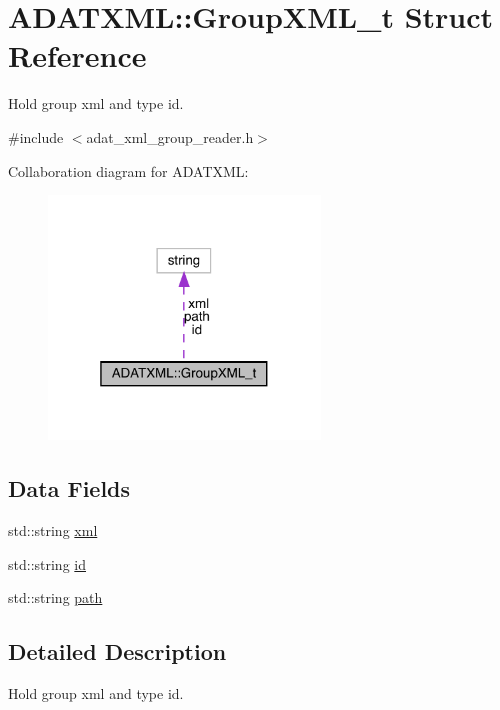 \hypertarget{structADATXML_1_1GroupXML__t}{}\section{A\+D\+A\+T\+X\+ML\+:\+:Group\+X\+M\+L\+\_\+t Struct Reference}
\label{structADATXML_1_1GroupXML__t}


Hold group xml and type id.  




{\ttfamily \#include $<$adat\+\_\+xml\+\_\+group\+\_\+reader.\+h$>$}



Collaboration diagram for A\+D\+A\+T\+X\+ML\+:\nopagebreak
\begin{figure}[H]
\begin{center}
\leavevmode
\includegraphics[width=205pt]{d7/d02/structADATXML_1_1GroupXML__t__coll__graph}
\end{center}
\end{figure}
\subsection*{Data Fields}
\begin{DoxyCompactItemize}
\item 
std\+::string \mbox{\hyperlink{structADATXML_1_1GroupXML__t_aa55c46630f1b4fa95f642c24a46e8323}{xml}}
\item 
std\+::string \mbox{\hyperlink{structADATXML_1_1GroupXML__t_a618530d5beb151a6c2993555d604bd6b}{id}}
\item 
std\+::string \mbox{\hyperlink{structADATXML_1_1GroupXML__t_a3dcdc0c3e78cfa5f84c28f79407c4ad2}{path}}
\end{DoxyCompactItemize}


\subsection{Detailed Description}
Hold group xml and type id. 



